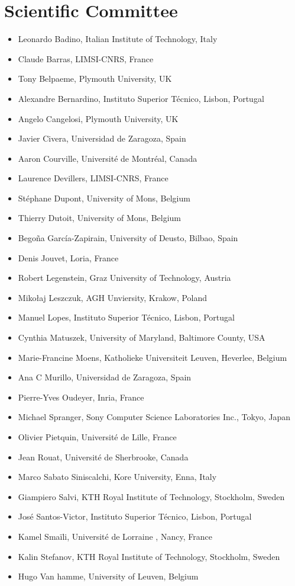 \documentclass{confproc}
\begin{document}
\section*{Scientific Committee}
\begin{itemize}
\item Leonardo Badino, Italian Institute of Technology, Italy
\item Claude Barras, LIMSI-CNRS, France
\item Tony Belpaeme, Plymouth University, UK
\item Alexandre Bernardino, Instituto Superior Técnico, Lisbon, Portugal
\item Angelo Cangelosi, Plymouth University, UK
\item Javier Civera, Universidad de Zaragoza, Spain
\item Aaron Courville, Université de Montréal, Canada
\item Laurence Devillers, LIMSI-CNRS, France
\item Stéphane Dupont, University of Mons, Belgium
\item Thierry Dutoit, University of Mons, Belgium
\item Begoña García-Zapirain, University of Deusto, Bilbao, Spain
\item Denis Jouvet, Loria, France
\item Robert Legenstein, Graz University of Technology, Austria
\item Mikołaj Leszczuk, AGH Unviersity, Krakow, Poland
\item Manuel Lopes, Instituto Superior Técnico, Lisbon, Portugal
\item Cynthia Matuszek, University of Maryland, Baltimore County, USA
\item Marie-Francine Moens, Katholieke Universiteit Leuven, Heverlee, Belgium
\item Ana C Murillo, Universidad de Zaragoza, Spain
\item Pierre-Yves Oudeyer, Inria, France
\item Michael Spranger, Sony Computer Science Laboratories Inc., Tokyo, Japan
\item Olivier Pietquin, Université de Lille, France
\item Jean Rouat, Université de Sherbrooke, Canada
\item Marco Sabato Siniscalchi, Kore University, Enna, Italy
\item Giampiero Salvi, KTH Royal Institute of Technology, Stockholm, Sweden
\item José Santos-Victor, Instituto Superior Técnico, Lisbon, Portugal
\item Kamel Smaïli, Université de Lorraine , Nancy, France
\item Kalin Stefanov, KTH Royal Institute of Technology, Stockholm, Sweden
\item Hugo Van hamme, University of Leuven, Belgium
\end{itemize}
\end{document}
